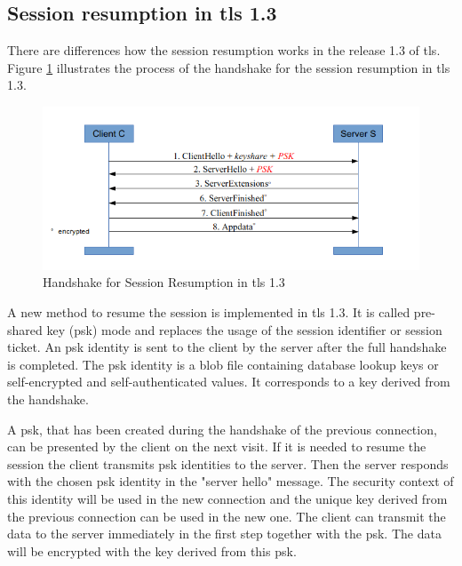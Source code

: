 \subsection{Session resumption in \gls{tls} 1.3}
\label{subsec:resumption1_3}

There are differences how the session resumption works in the release 1.3 of \gls{tls}. Figure \ref{fig:resumption1_3} illustrates the process of the handshake for the session resumption in \gls{tls} 1.3.

\begin{figure}[H]
	\centering
		\includegraphics[scale=0.8]{images/resumption1_3.png}
	\caption{Handshake for Session Resumption in \gls{tls} 1.3 \cite{Hassenstein}}
	\label{fig:resumption1_3}
\end{figure}

A new method to resume the session is implemented in \gls{tls} 1.3. It is called pre-shared key (\gls{psk}) mode and replaces the usage of the session identifier or session ticket. An \gls{psk} identity is sent to the client by the server after the full handshake is completed. The \gls{psk} identity is a blob file containing database lookup keys or self-encrypted and self-authenticated values. It corresponds to a key derived from the handshake.

A \gls{psk}, that has been created during the handshake of the previous connection, can be presented by the client on the next visit. If it is needed to resume the session the client transmits \gls{psk} identities to the server. Then the server responds with the chosen \gls{psk} identity in the "server hello" message. The security context of this identity will be used in the new connection and the unique key derived from the previous connection can be used in the new one. 
The client can transmit the data to the server immediately in the first step together with the \gls{psk}. The data will be encrypted with the key derived from this \gls{psk}. \cite{ldapwiki:resumption}


